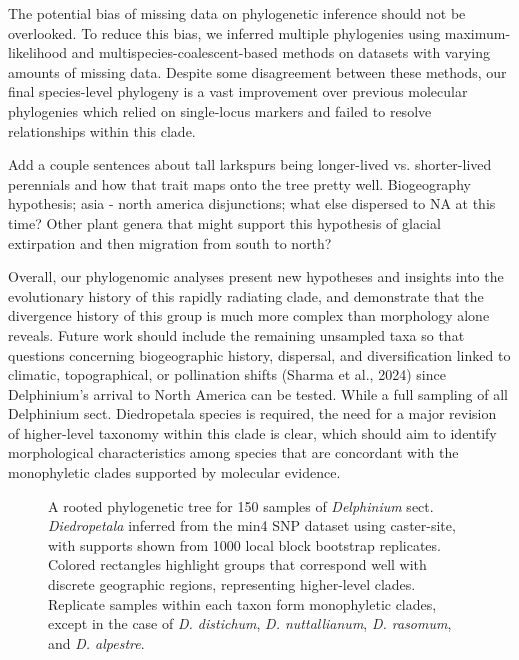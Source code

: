 \documentclass[11pt]{article}
\newcommand{\beginsupplement}{%
	\setcounter{table}{0}
	\setcounter{figure}{0}
	\renewcommand{\thetable}{S\arabic{table}}%
	\renewcommand{\thefigure}{S\arabic{figure}}%
}
\begin{document}
The potential bias of missing data on phylogenetic inference should not be overlooked. To reduce this bias, we inferred multiple phylogenies using maximum-likelihood and multispecies-coalescent-based methods on datasets with varying amounts of missing data. Despite some disagreement between these methods, our final species-level phylogeny is a vast improvement over previous molecular phylogenies which relied on single-locus markers and failed to resolve relationships within this clade.

Add a couple sentences about tall larkspurs being longer-lived vs. shorter-lived perennials and how that trait maps onto the tree pretty well.
Biogeography hypothesis; asia - north america disjunctions; what else dispersed to NA at this time? Other plant genera that might support this hypothesis of glacial extirpation and then migration from south to north?

Overall, our phylogenomic analyses present new hypotheses and insights into the evolutionary history of this rapidly radiating clade, and demonstrate that the divergence history of this group is much more complex than morphology alone reveals. Future work should include the remaining unsampled taxa so that questions concerning biogeographic history, dispersal, and diversification linked to climatic, topographical, or pollination shifts (Sharma et al., 2024) since Delphinium’s arrival to North America can be tested. While a full sampling of all Delphinium sect. Diedropetala species is required, the need for a major revision of higher-level taxonomy within this clade is clear, which should aim to identify morphological characteristics among species that are concordant with the monophyletic clades supported by molecular evidence.



  



\beginsupplement

\begin{figure}[p]
	\centering
	\caption{
		A rooted phylogenetic tree for 150 samples of \emph{Delphinium} sect. \emph{Diedropetala}
		inferred from the min4 SNP dataset using caster-site, with supports shown from
		1000 local block bootstrap replicates. 
		Colored rectangles highlight
		groups that correspond well with discrete geographic regions, representing higher-level 
		clades. Replicate samples within each taxon form monophyletic clades, except in the case
		of \emph{D. distichum}, \emph{D. nuttallianum}, \emph{D. rasomum}, and \emph{D. alpestre}.
	}
	\label{fig:S1}
\end{figure}
\end{document}
